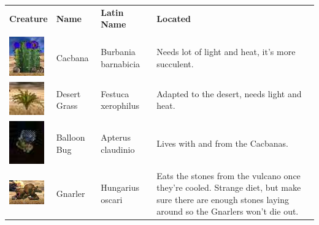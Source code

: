 \documentclass[11pt,twoside,a4paper]{article}
\begin{document}
\begin{tabular}[h]{ p{1.60cm} p{1.95cm} p{2.55cm} p{11.00cm} }
	\rowcolor[gray]{0.50}	\textbf{Creature}					&	\textbf{Name}	&	\textbf{Latin Name}			&	\textbf{Located}		\\ 
																&					&								&							\\ 
	\begin{minipage}[ht]{1.55cm} \includegraphics[width=1.50cm]{img/cacbana.jpg} \end{minipage}		
																&	Cacbana			&	Burbania \newline barnabicia		
																&	Needs lot of light and heat, it's more succulent.	\\
	\begin{minipage}[ht]{1.55cm} \includegraphics[width=1.50cm]{img/wgrass.jpg} \end{minipage}		
																&	Desert Grass	&	Festuca \newline xerophilus		
																&	Adapted to the desert, needs light and heat.	\\
	\begin{minipage}[ht]{1.55cm} \includegraphics[width=1.50cm]{img/balloon.jpg} \end{minipage}		
																&	Balloon Bug		&	Apterus \newline claudinio		
																&	Lives with and from the Cacbanas.	\\
	\begin{minipage}[ht]{1.55cm} \includegraphics[width=1.50cm]{img/gnarler.jpg} \end{minipage}		
																&	Gnarler			&	Hungarius \newline oscari		
																&	Eats the stones from the vulcano once they're cooled. Strange diet, but make sure there are enough stones laying around so the Gnarlers won't die out.	\\

\end{tabular}
\end{document}
